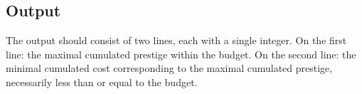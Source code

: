 \subsection*{Output}
The output should consist of two lines, each with a single integer.
On the first line: the maximal cumulated prestige within
the budget. On the second line: the minimal cumulated cost
corresponding to the maximal cumulated prestige, necessarily less than or equal to
the budget.
